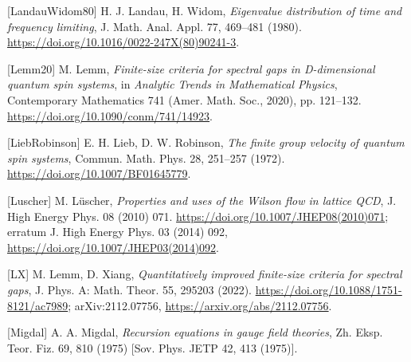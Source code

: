 \documentclass[10pt,letterpaper,twocolumn]{article}
\begin{document}
{[}LandauWidom80{]} H. J. Landau, H. Widom, \emph{Eigenvalue distribution of time and frequency limiting}, J. Math. Anal. Appl. 77, 469--481 (1980). \href{https://doi.org/10.1016/0022-247X(80)90241-3}{https:\allowbreak{}/\allowbreak{}/\allowbreak{}doi.\allowbreak{}org/\allowbreak{}10.\allowbreak{}1016/\allowbreak{}0022-\allowbreak{}247X(\allowbreak{}80)\allowbreak{}90241-\allowbreak{}3}.

{[}Lemm20{]} M. Lemm, \emph{Finite-size criteria for spectral gaps in D-dimensional quantum spin systems}, in \emph{Analytic Trends in Mathematical Physics}, Contemporary Mathematics 741 (Amer. Math. Soc., 2020), pp. 121--132. \href{https://doi.org/10.1090/conm/741/14923}{https:\allowbreak{}/\allowbreak{}/\allowbreak{}doi.\allowbreak{}org/\allowbreak{}10.\allowbreak{}1090/\allowbreak{}conm/\allowbreak{}741/\allowbreak{}14923}.

{[}LiebRobinson{]} E. H. Lieb, D. W. Robinson, \emph{The finite group velocity of quantum spin systems}, Commun. Math. Phys. 28, 251--257 (1972). \href{https://doi.org/10.1007/BF01645779}{https:\allowbreak{}/\allowbreak{}/\allowbreak{}doi.\allowbreak{}org/\allowbreak{}10.\allowbreak{}1007/\allowbreak{}BF016457\allowbreak{}79}.

{[}Luscher{]} M. Lüscher, \emph{Properties and uses of the Wilson flow in lattice QCD}, J. High Energy Phys. 08 (2010) 071. \href{https://doi.org/10.1007/JHEP08(2010)071}{https:\allowbreak{}/\allowbreak{}/\allowbreak{}doi.\allowbreak{}org/\allowbreak{}10.\allowbreak{}1007/\allowbreak{}JHEP08(\allowbreak{}2010)\allowbreak{}071}; erratum J. High Energy Phys. 03 (2014) 092, \href{https://doi.org/10.1007/JHEP03(2014)092}{https:\allowbreak{}/\allowbreak{}/\allowbreak{}doi.\allowbreak{}org/\allowbreak{}10.\allowbreak{}1007/\allowbreak{}JHEP03(\allowbreak{}2014)\allowbreak{}092}.

{[}LX{]} M. Lemm, D. Xiang, \emph{Quantitatively improved finite-size criteria for spectral gaps}, J. Phys. A: Math. Theor. 55, 295203 (2022). \href{https://doi.org/10.1088/1751-8121/ac7989}{https:\allowbreak{}/\allowbreak{}/\allowbreak{}doi.\allowbreak{}org/\allowbreak{}10.\allowbreak{}1088/\allowbreak{}1751-\allowbreak{}8121/\allowbreak{}ac7989}; arXiv:2112.07756, \href{https://arxiv.org/abs/2112.07756}{https:\allowbreak{}/\allowbreak{}/\allowbreak{}arxiv.\allowbreak{}org/\allowbreak{}abs/\allowbreak{}2112.\allowbreak{}07756}.

{[}Migdal{]} A. A. Migdal, \emph{Recursion equations in gauge field theories}, Zh. Eksp. Teor. Fiz. 69, 810 (1975) {[}Sov. Phys. JETP 42, 413 (1975){]}.
\end{document}

